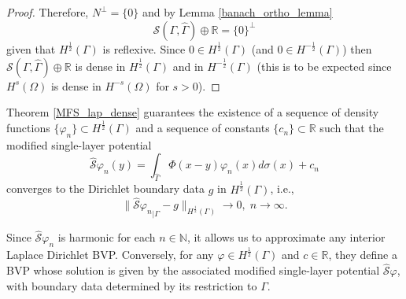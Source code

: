 \begin{proof}
    Therefore, \(N^\perp = \{0\}\) and by Lemma \ref{banach_ortho_lemma}
    \[
        \mathcal{S}(\Gamma, \hat{\Gamma}) \oplus \mathbb{R} = \{0\}^\perp
    \]
    given that \(H^\frac{1}{2}(\Gamma)\) is reflexive. Since \(0 \in H^\frac{1}{2}(\Gamma)\) (and \(0 \in H^{-\frac{1}{2}}(\Gamma)\)) then \(\mathcal{S}(\Gamma, \hat{\Gamma}) \oplus \mathbb{R}\) is dense in \(H^\frac{1}{2}(\Gamma)\) and in \(H^{-\frac{1}{2}}(\Gamma)\) (this is to be expected since \(H^{s}(\Omega)\) is dense in \(H^{-s}(\Omega)\) for \(s > 0\)).
\end{proof}

\begin{remark}\label{remark_density_sequence_density_layers}
    Theorem \ref{MFS_lap_dense} guarantees the existence of a sequence of density functions $\{\varphi_n\} \subset H^{\frac{1}{2}}(\Gamma)$ and a sequence of constants $\{c_n\} \subset \mathbb{R}$ such that the modified single-layer potential
    \[
    \hat{\mathcal{S}}\varphi_n(y) = \int_{\hat{\Gamma}} \Phi(x-y)\varphi_n(x) d\sigma(x) + c_n
    \]
    converges to the Dirichlet boundary data $g$ in $H^\frac{1}{2}(\Gamma)$, i.e.,
    \[
    \|{\hat{\mathcal{S}}\varphi_n}_{|\Gamma} - g\|_{H^\frac{1}{2}(\Gamma)} \rightarrow 0, \; n \rightarrow \infty.
    \]

    Since $\hat{\mathcal{S}}\varphi_n$ is harmonic for each $n \in \mathbb{N}$, it allows us to approximate any interior Laplace Dirichlet \ac{BVP}. Conversely, for any $\varphi \in H^\frac{1}{2}(\Gamma)$ and $c \in \mathbb{R}$, they define a \ac{BVP} whose solution is given by the associated modified single-layer potential $\hat{\mathcal{S}}\varphi$, with boundary data determined by its restriction to \(\Gamma\).

\end{remark}

